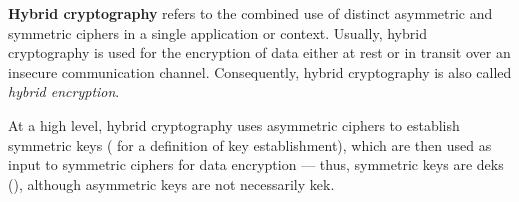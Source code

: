 \textbf{Hybrid cryptography} refers to the combined use of distinct asymmetric and symmetric ciphers in a single application or context. Usually, hybrid cryptography is used for the encryption of data either at rest or in transit over an insecure communication channel. Consequently, hybrid cryptography is also called \textit{hybrid encryption}.

At a high level, hybrid cryptography uses asymmetric ciphers to establish symmetric keys ( for a definition of key establishment), which are then used as input to symmetric ciphers for data encryption --- thus, symmetric keys are \glspl{dek} (), although asymmetric keys are not necessarily \gls{kek}.

